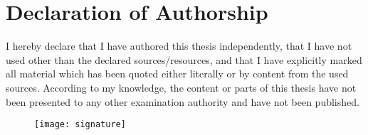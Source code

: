 \section{Declaration of Authorship}
\label{declaration}

I hereby declare that I have authored this thesis independently, that I have not used other than the
declared sources/resources, and that I have explicitly marked all material which has been quoted
either literally or by content from the used sources. According to my knowledge, the content or parts
of this thesis have not been presented to any other examination authority and have not been
published.


\begin{figure}[htbp]
	\texttt{[image: signature]}
\end{figure}
